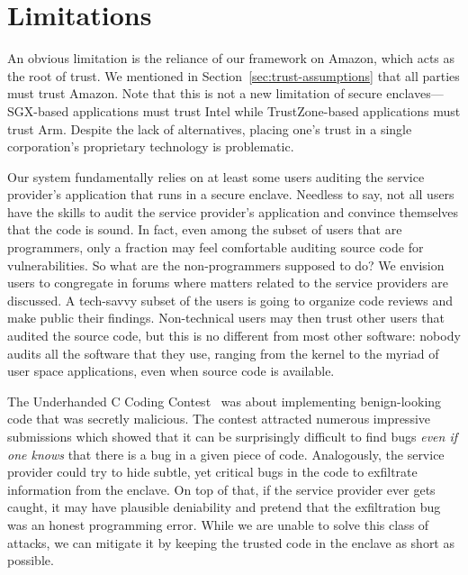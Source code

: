 \section{Limitations}
\label{sec:limitations}

An obvious limitation is the reliance of our framework on Amazon, which acts as the root of trust.  We mentioned in Section~\ref{sec:trust-assumptions} that all parties must trust Amazon.  Note that this is not a new limitation of secure enclaves---SGX-based applications must trust Intel while TrustZone-based applications must trust Arm.  Despite the lack of alternatives, placing one's trust in a single corporation's proprietary technology is problematic.

Our system fundamentally relies on at least some users auditing the service provider's application that runs in a secure enclave.  Needless to say, not all users have the skills to audit the service provider's application and convince themselves that the code is sound.  In fact, even among the subset of users that are programmers, only a fraction may feel comfortable auditing source code for vulnerabilities.  So what are the non-programmers supposed to do?  We envision users to congregate in forums where matters related to the service providers are discussed.  A tech-savvy subset of the users is going to organize code reviews and make public their findings.  Non-technical users may then trust other users that audited the source code, but this is no different from most other software: nobody audits all the software that they use, ranging from the kernel to the myriad of user space applications, even when source code is available.

The Underhanded C Coding Contest~\cite{underhanded-c} was about implementing benign-looking code that was secretly malicious.  The contest attracted numerous impressive submissions which showed that it can be surprisingly difficult to find bugs \emph{even if one knows} that there is a bug in a given piece of code.  Analogously, the service provider could try to hide subtle, yet critical bugs in the code to exfiltrate information from the enclave.  On top of that, if the service provider ever gets caught, it may have plausible deniability and pretend that the exfiltration bug was an honest programming error.  While we are unable to solve this class of attacks, we can mitigate it by keeping the trusted code in the enclave as short as possible.
